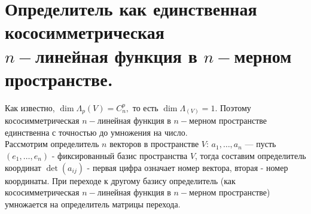 \documentclass[a4paper]{article}%
\newcommand{\baz}[1]{\left(#1_1,\dots,#1_n\right)}%
\begin{document}
\section{Определитель как единственная кососимметрическая\\ $n-$линейная функция в $n-$мерном пространстве.}
\label{q64}
Как известно, $\dim\Lambda_p(V)=C_n^p,$ то есть $\dim\Lambda_(V)=1.$ Поэтому кососимметрическая $n-$линейная функция в $n-$мерном пространстве
единственна с точностью до умножения на число.
\\
Рассмотрим определитель $n$ векторов в пространстве $V$: $a_1,\dots,a_n$ ---
пусть $\baz{e}$ - фиксированный базис пространства $V$, тогда составим определитель координат $\det(a_{ij})$ - первая цифра
означает номер вектора, вторая - номер координаты. При переходе к другому базису определитель (как кососимметрическая $n-$линейная функция в $n-$мерном пространстве) умножается
на определитель матрицы перехода.
\end{document}
